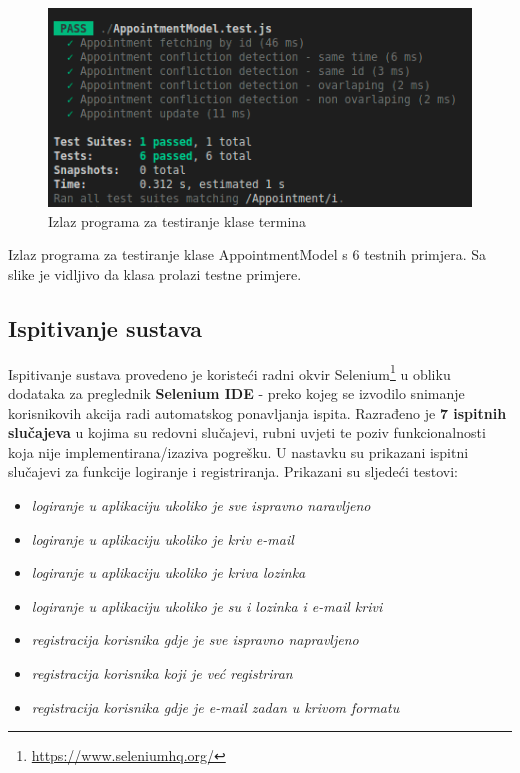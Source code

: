                 \begin{figure}[H]
                    \includegraphics[width=\textwidth]{slike/appointment_tests_out.png} %
                    \caption{Izlaz programa za testiranje klase termina}
                    \label{fig:test4} %
                \end{figure}
                Izlaz programa za testiranje klase AppointmentModel s 6 testnih primjera. Sa slike je vidljivo da klasa prolazi testne primjere.
			
			
			\subsection{Ispitivanje sustava}
			
			 Ispitivanje sustava provedeno je koristeći radni okvir Selenium\footnote{\url{https://www.seleniumhq.org/}} u obliku dodataka za preglednik \textbf{Selenium IDE} - preko kojeg se izvodilo snimanje korisnikovih akcija radi automatskog ponavljanja ispita. Razrađeno je \textbf{7 ispitnih slučajeva} u kojima su redovni slučajevi, rubni uvjeti te poziv funkcionalnosti koja nije implementirana/izaziva pogrešku. U nastavku su prikazani ispitni slučajevi za funkcije logiranje i registriranja. Prikazani su sljedeći testovi:
    	\begin{itemize}
		\item 	\textit{logiranje u aplikaciju ukoliko je sve ispravno naravljeno}
		\item 	\textit{logiranje u aplikaciju ukoliko je kriv e-mail}
		\item 	\textit{logiranje u aplikaciju ukoliko je kriva lozinka}
		\item 	\textit{logiranje u aplikaciju ukoliko je su i lozinka i e-mail krivi}
		\item 	\textit{registracija korisnika gdje je sve ispravno napravljeno}
		\item 	\textit{registracija korisnika koji je već registriran}
		\item 	\textit{registracija korisnika gdje je e-mail zadan u krivom formatu}
	\end{itemize}

